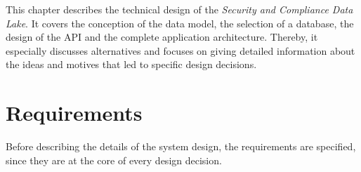 
This chapter describes the technical design of the \textit{Security and Compliance Data Lake}. It covers the conception of the data model, the selection of a database, the design of the API and the complete application architecture. Thereby, it especially discusses alternatives and focuses on giving detailed information about the ideas and motives that led to specific design decisions.

\section{Requirements} \label{sec:Requirements}
Before describing the details of the system design, the requirements are specified, since they are at the core of every design decision.  

